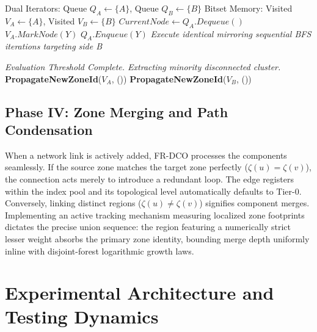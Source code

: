 \documentclass[runningheads]{llncs}
\begin{document}
\begin{algorithm}[H]
\caption{Bi-directional Component Verification (BCV Engine Logic)}\label{alg:bcv}
\begin{algorithmic}[1]
    \State Dual Iterators: Queue $Q_A \gets \{A\}$, Queue $Q_B \gets \{B\}$
    \State Bitset Memory: Visited $V_A \gets \{A\}$, Visited $V_B \gets \{B\}$
        \State $CurrentNode \gets Q_A.Dequeue()$
                \State \Return {}
            \EndIf
                \State $V_A.MarkNode(Y)$
                \State $Q_A.Enqueue(Y)$
            \EndIf
        \EndFor
        \State \textit{Execute identical mirroring sequential BFS iterations targeting side B}
    \EndWhile
    
    \State \textit{Evaluation Threshold Complete. Extracting minority disconnected cluster.}
        \State \textbf{PropagateNewZoneId}($V_A$, ())
    \Else
        \State \textbf{PropagateNewZoneId}($V_B$, ())
    \EndIf
\EndProcedure
\end{algorithmic}
\end{algorithm}

\subsection{Phase IV: Zone Merging and Path Condensation}
When a network link is actively added, FR-DCO processes the components seamlessly. If the source zone matches the target zone perfectly ($\zeta(u) = \zeta(v)$), the connection acts merely to introduce a redundant loop. The edge registers within the index pool and its topological level automatically defaults to Tier-0. 
Conversely, linking distinct regions ($\zeta(u) \neq \zeta(v)$) signifies component merges. Implementing an active tracking mechanism measuring localized zone footprints dictates the precise union sequence: the region featuring a numerically strict lesser weight absorbs the primary zone identity, bounding merge depth uniformly inline with disjoint-forest logarithmic growth laws.

\section{Experimental Architecture and Testing Dynamics}
\end{document}
